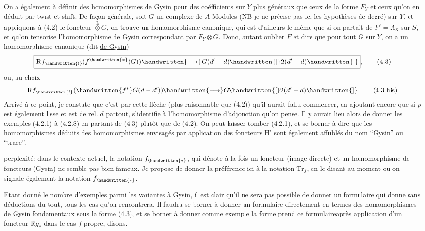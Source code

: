  On a également à définir des homomorphismes de Gysin pour des coéfficients sur $Y$ plus généraux que ceux de la forme $F_Y$ et ceux qu'on en déduit par twist et shift. De façon générale, soit $G$ un complexe de $A$-Modules (NB je ne précise pas ici les hypothèses de degré) sur $Y$, et appliquons à (4.2) le foncteur $\overset{\mathrm{L}}{\otimes}G$, on trouve un homomorphisme canonique, qui est d'ailleurs le même que si on partait de  $F'=A_S$ sur $S$, et qu'on tensorise l'homomorphisme de Gysin correspondant par $F_Y\otimes G$. Donc, autant oublier $F$ et dire que pour tout $G$ sur $Y$, on a un homomorphisme canonique (dit \uline{de Gysin})
\[
\boxed{\mathrm{R}f_{\handwritten{!}}(f^{\handwritten{*}}(G))\handwritten{\longrightarrow}G(d'-d)\handwritten{[}2(d'-d)\handwritten{]}},
\tag*{(4.3)}
\]
ou, au choix
\[
\mathrm{R}f_{\handwritten{!}}(\handwritten{f^*}G(d-d'))\handwritten{\longrightarrow}G\handwritten{[}2(d'-d)\handwritten{]}.
\tag*{(4.3 bis)}
\]
Arrivé à ce point, je constate que c'est par cette flèche (plus raisonnable que (4.2)) qu'il aurait fallu commencer, en ajoutant encore que si $p$ est également lisse et est de  rel. $d$ partout,  s'identifie à l'homomorphisme d'adjonction qu'on pense. Il y aurait lieu alors de donner les exemples (4.2.1) à (4.2.8)  en partant de (4.3) plutôt que de (4.2). On peut laisser tomber (4.2.1), et se borner à dire que les homomorphismes déduits des homomorphismes envisagés par application des foncteurs $\mathrm{H}^i$ sont également affublés du nom ``Gysin'' ou ``trace''.

 perplexité: dans le contexte actuel, la notation $f_{\handwritten{*}}$, qui dénote à la fois un foncteur (image directe) et un homomorphisme de foncteurs (Gysin) ne semble pas bien fameux. Je propose de donner la préférence ici à la notation $\mathrm{Tr}_f$, en le disant au moment ou on signale également la notation $f_{\handwritten{*}}$.

Etant donné le nombre d'exemples parmi les variantes à Gysin, il est clair qu'il ne sera pas possible de donner un formulaire qui donne  sans déductions du tout, tous les cas qu'on rencontrera. Il faudra se borner à donner un formulaire directement en termes des homomorphismes de Gysin fondamentaux sous la forme (4.3), et se borner à donner comme exemple la forme  prend ce formulaireaprès application d'un foncteur $\mathrm{R}g_*$ dans le cas $f$ propre, disons.

